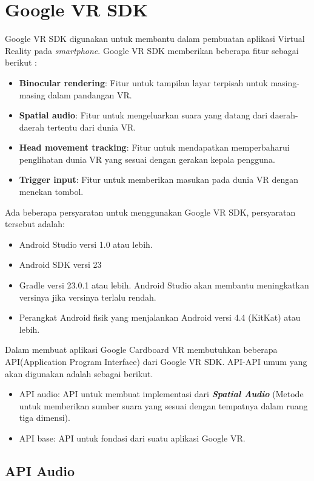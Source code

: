 \section{Google VR SDK}
\label{sec:google_vr_sdk}
Google VR SDK digunakan untuk membantu dalam pembuatan aplikasi Virtual Reality pada \textit{smartphone}.\cite{google_vr_developers} Google VR SDK memberikan beberapa fitur sebagai berikut :
\begin{itemize}
	\item \textbf{Binocular rendering}: Fitur untuk tampilan layar terpisah untuk masing-masing dalam pandangan VR.
	\item \textbf{Spatial audio}: Fitur untuk mengeluarkan suara yang datang dari daerah-daerah tertentu dari dunia VR.
	\item \textbf{Head movement tracking}: Fitur untuk mendapatkan memperbaharui penglihatan dunia VR yang sesuai dengan gerakan kepala pengguna.
	\item \textbf{Trigger input}: Fitur untuk memberikan masukan pada dunia VR dengan menekan tombol.
\end{itemize}

Ada beberapa persyaratan untuk menggunakan Google VR SDK, persyaratan tersebut adalah:
\begin{itemize}
	\item Android Studio versi 1.0 atau lebih.
	\item Android SDK versi 23
	\item Gradle versi 23.0.1 atau lebih. Android Studio akan membantu meningkatkan versinya jika versinya terlalu rendah.
	\item Perangkat Android fisik yang menjalankan Android versi 4.4 (KitKat) atau lebih.
\end{itemize}

Dalam membuat aplikasi Google Cardboard VR membutuhkan beberapa API(Application Program Interface) dari Google VR SDK. API-API umum yang akan digunakan adalah sebagai berikut. 
\begin{itemize}
	\item API audio: API untuk membuat implementasi dari \textbf{\textit{Spatial Audio}} (Metode untuk memberikan sumber suara yang sesuai dengan tempatnya dalam ruang tiga dimensi).
	\item API base: API untuk fondasi dari suatu aplikasi Google VR.
\end{itemize}

\subsection{API Audio}
\label{sec:api_audio}

